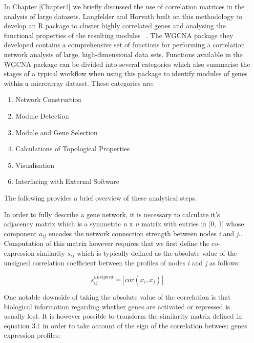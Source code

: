In Chapter \ref{Chapter1} we briefly discussed the use of correlation matrices in the analysis of large datasets. Langfelder and Horvath built on this methodology to develop an R package to cluster highly correlated genes and analysing the functional properties of the resulting modules ~\autocite{Lan2008}. The WGCNA package they developed contains a comprehensive set of functions for performing a correlation network analysis of large, high-dimensional data sets. Functions available in the WGCNA package can be divided into several categories which also summarise the stages of a typical workflow when using this package to identify modules of genes within a microarray dataset. These categories are:

\begin{enumerate}
    \item Network Construction 
    \item Module Detection 
    \item Module and Gene Selection 
    \item Calculations of Topological Properties 
    \item Visualisation
    \item Interfacing with External Software 
\end{enumerate}

The following provides a brief overview of these analytical steps. 


In order to fully describe a gene network, it is necessary to calculate it's adjacency matrix which is a symmetric \textit{n} x \textit{n} matrix with entries in [0, 1] whose component \textit{$a_{ij}$} encodes the network connection strength between nodes \textit{i} and \textit{j}.. Computation of this matrix however requires that we first define the co-expression similarity \textit{$s_{ij}$} which is typically defined as the absolute value of the unsigned correlation coefficient between the profiles of nodes \textit{i} and \textit{j} as follows: 

\begin{equation}
    s_{ij}^{unsigned} = |cor(x_i, x_j)|
\end{equation}

One notable downside of taking the absolute value of the correlation is that biological information regarding whether genes are activated or repressed is usually lost. It is however possible to transform the similarity matrix defined in equation 3.1 in order to take account of the sign of the correlation between genes expression profiles: 

